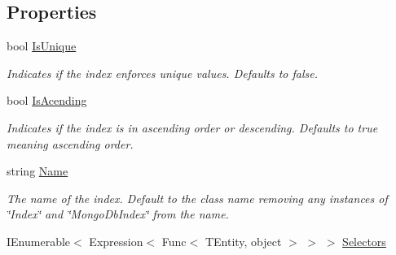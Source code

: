 \subsection*{Properties}
\begin{DoxyCompactItemize}
\item 
bool \hyperlink{classCqrs_1_1MongoDB_1_1DataStores_1_1Indexes_1_1MongoDbIndex_a8618b5c9ec2aa1972a57b61aac05bcdd_a8618b5c9ec2aa1972a57b61aac05bcdd}{Is\+Unique}
\begin{DoxyCompactList}\small\item\em Indicates if the index enforces unique values. Defaults to false. \end{DoxyCompactList}\item 
bool \hyperlink{classCqrs_1_1MongoDB_1_1DataStores_1_1Indexes_1_1MongoDbIndex_a0151a455f20dabb16c15156dc1cdf85f_a0151a455f20dabb16c15156dc1cdf85f}{Is\+Acending}
\begin{DoxyCompactList}\small\item\em Indicates if the index is in ascending order or descending. Defaults to true meaning ascending order. \end{DoxyCompactList}\item 
string \hyperlink{classCqrs_1_1MongoDB_1_1DataStores_1_1Indexes_1_1MongoDbIndex_af18f67df8e73bc4d9fc2239cd6d798b6_af18f67df8e73bc4d9fc2239cd6d798b6}{Name}
\begin{DoxyCompactList}\small\item\em The name of the index. Default to the class name removing any instances of \char`\"{}\+Index\char`\"{} and \char`\"{}\+Mongo\+Db\+Index\char`\"{} from the name. \end{DoxyCompactList}\item 
I\+Enumerable$<$ Expression$<$ Func$<$ T\+Entity, object $>$ $>$ $>$ \hyperlink{classCqrs_1_1MongoDB_1_1DataStores_1_1Indexes_1_1MongoDbIndex_a13bb1a8d07f1cce7c8d6ce77e3be0629_a13bb1a8d07f1cce7c8d6ce77e3be0629}{Selectors}
\end{DoxyCompactItemize}


